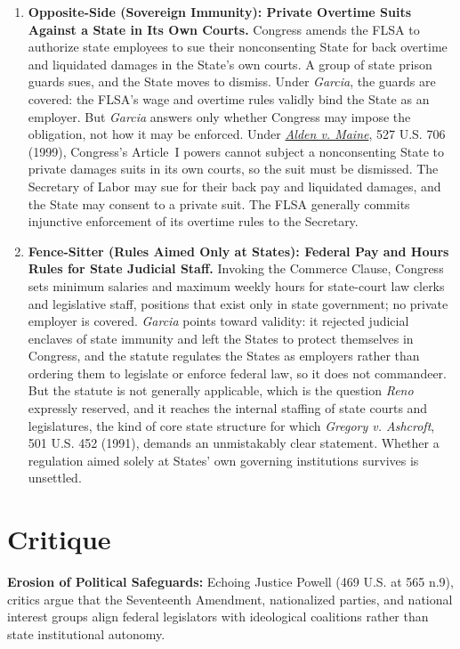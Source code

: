 \documentclass[12pt]{article}
\begin{document}
\begin{enumerate}
\item \textbf{Opposite-Side (Sovereign Immunity): Private Overtime Suits Against a State in Its Own Courts.} Congress amends the FLSA to authorize state employees to sue their nonconsenting State for back overtime and liquidated damages in the State's own courts. A group of state prison guards sues, and the State moves to dismiss. Under \textit{Garcia}, the guards are covered: the FLSA's wage and overtime rules validly bind the State as an employer. But \textit{Garcia} answers only whether Congress may impose the obligation, not how it may be enforced. Under \href{https://supreme.justia.com/cases/federal/us/527/706/}{\textit{Alden v. Maine}}, 527 U.S. 706 (1999), Congress's Article~I powers cannot subject a nonconsenting State to private damages suits in its own courts, so the suit must be dismissed. The Secretary of Labor may sue for their back pay and liquidated damages, and the State may consent to a private suit. The FLSA generally commits injunctive enforcement of its overtime rules to the Secretary.

\item \textbf{Fence-Sitter (Rules Aimed Only at States): Federal Pay and Hours Rules for State Judicial Staff.} Invoking the Commerce Clause, Congress sets minimum salaries and maximum weekly hours for state-court law clerks and legislative staff, positions that exist only in state government; no private employer is covered. \textit{Garcia} points toward validity: it rejected judicial enclaves of state immunity and left the States to protect themselves in Congress, and the statute regulates the States as employers rather than ordering them to legislate or enforce federal law, so it does not commandeer. But the statute is not generally applicable, which is the question \textit{Reno} expressly reserved, and it reaches the internal staffing of state courts and legislatures, the kind of core state structure for which \textit{Gregory v. Ashcroft}, 501 U.S. 452 (1991), demands an unmistakably clear statement. Whether a regulation aimed solely at States' own governing institutions survives is unsettled.

\end{enumerate}

\section{Critique}
\textbf{Erosion of Political Safeguards:} Echoing Justice Powell (469 U.S. at 565 n.9), critics argue that the Seventeenth Amendment, nationalized parties, and national interest groups align federal legislators with ideological coalitions rather than state institutional autonomy.
\end{document}

